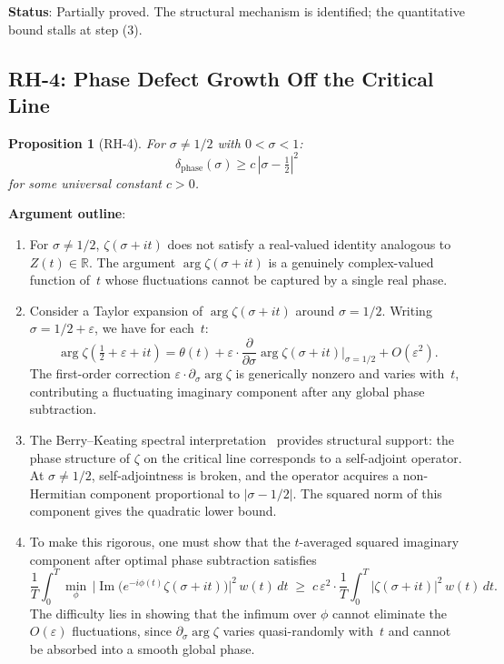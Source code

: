 \documentclass[11pt]{article}
\newtheorem{proposition}[theorem]{Proposition}
\theoremstyle{remark}
\DeclareMathOperator{\Ima}{Im}
\begin{document}
\medskip
\noindent\textbf{Status}: Partially proved.  The structural mechanism is identified;
the quantitative bound stalls at step (3).

\subsection{RH-4: Phase Defect Growth Off the Critical Line}
\label{subsec:RH4}

\begin{proposition}[RH-4]
For $\sigma\neq 1/2$ with $0<\sigma<1$:
\[
  \delta_{\mathrm{phase}}(\sigma) \geq c\,|\sigma-\tfrac{1}{2}|^2
\]
for some universal constant $c>0$.
\end{proposition}

\noindent\textbf{Argument outline}:
\begin{enumerate}
  \item For $\sigma\neq 1/2$, $\zeta(\sigma+it)$ does not satisfy a
    real-valued identity analogous to $Z(t)\in\mathbb{R}$.
    The argument $\arg\zeta(\sigma+it)$ is a genuinely complex-valued function of~$t$
    whose fluctuations cannot be captured by a single real phase.

  \item Consider a Taylor expansion of $\arg\zeta(\sigma+it)$ around $\sigma=1/2$.
    Writing $\sigma=1/2+\varepsilon$, we have for each~$t$:
    \[
      \arg\zeta\!\left(\tfrac{1}{2}+\varepsilon+it\right)
      = \theta(t) + \varepsilon\cdot\frac{\partial}{\partial\sigma}\arg\zeta(\sigma+it)
        \bigg|_{\sigma=1/2} + O(\varepsilon^2).
    \]
    The first-order correction $\varepsilon\cdot\partial_\sigma\arg\zeta$ is
    generically nonzero and varies with~$t$, contributing a fluctuating imaginary
    component after any global phase subtraction.

  \item The Berry--Keating spectral interpretation~\cite{BK} provides structural support:
    the phase structure of $\zeta$ on the critical line corresponds to a self-adjoint
    operator.
    At $\sigma\neq 1/2$, self-adjointness is broken, and the operator acquires a
    non-Hermitian component proportional to $|\sigma-1/2|$.
    The squared norm of this component gives the quadratic lower bound.

  \item To make this rigorous, one must show that the $t$-averaged squared imaginary
    component after optimal phase subtraction satisfies
    \[
      \frac{1}{T}\int_0^T
      \min_{\phi}\,
      \bigl|\Ima\bigl(e^{-i\phi(t)}\zeta(\sigma+it)\bigr)\bigr|^2\,w(t)\,dt
      \;\geq\; c\,\varepsilon^2 \cdot
      \frac{1}{T}\int_0^T|\zeta(\sigma+it)|^2\,w(t)\,dt.
    \]
    The difficulty lies in showing that the infimum over $\phi$ cannot eliminate the
    $O(\varepsilon)$ fluctuations, since $\partial_\sigma\arg\zeta$ varies
    quasi-randomly with~$t$ and cannot be absorbed into a smooth global phase.
\end{enumerate}
\end{document}
